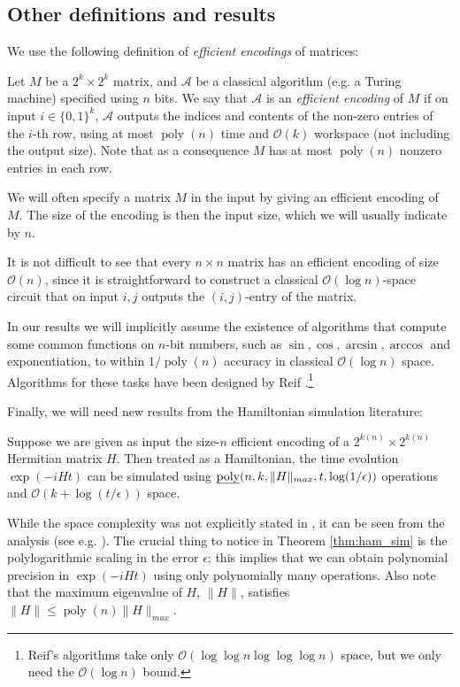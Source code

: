 \documentclass[a4paper,UKenglish]{lipics-v2016}
\newcommand\bigoh{\mathcal{O}}
\DeclareMathOperator{\poly}{poly}
\begin{document}
\subsection{Other definitions and results}
We use the following definition of \emph{efficient encodings} of matrices:
\begin{definition}\label{def: efficient encoding}Let $M$ be a $2^{k} \times 2^{k}$ matrix, and $\mathcal{A}$ be a classical algorithm (e.g. a Turing machine) specified using $n$ bits. We say that $\mathcal{A}$ is an \emph{efficient encoding} of $M$ if on input $i\in\{0,1\}^k$, $\mathcal{A}$ outputs the indices and contents of the non-zero entries of the $i$-th row, using at most $\poly(n)$ time and $\bigoh(k)$ workspace (not including the output size). Note that as a consequence $M$ has at most $\poly(n)$ nonzero entries in each row.
\end{definition}
We will often specify a matrix $M$ in the input by giving an efficient encoding of $M$. The size of the encoding is then the input size, which we will usually indicate by $n$. 
\begin{remark} \label{rem:logspace}
It is not difficult to see that every $n \times n$ matrix has an efficient encoding of size $\bigoh(n)$, since it is straightforward to construct a classical $\bigoh(\log n)$-space circuit that on input $i,j$ outputs the $(i,j)$-entry of the matrix.
\end{remark}

In our results we will implicitly assume the existence of algorithms that compute some common functions on $n$-bit numbers, such as $\sin,\cos,\arcsin,\arccos$ and exponentiation, to within $1/\poly(n)$ accuracy in classical $\bigoh (\log{n})$ space.  Algorithms for these tasks have been designed by Reif \cite{reif}.\footnote{Reif's algorithms take only $\bigoh (\log\log{n}\log\log\log{n})$ space, but we only need the $\bigoh (\log{n})$ bound.}

Finally, we will need new results from the Hamiltonian simulation literature:
\begin{theorem} \label{thm:ham_sim}
Suppose we are given as input the size-$n$ efficient encoding of a $2^{k(n)} \times 2^{k(n)}$ Hermitian matrix $H$. Then treated as a Hamiltonian, the time evolution $\exp(-iHt)$ can be simulated using $\text{\emph{poly}}(n,k,\|H\|_{max}, t, \log(1/\epsilon))$ operations and $\bigoh(k+\log(t/\epsilon))$ space.
\end{theorem}
While the space complexity was not explicitly stated in \cite{berry14,bccks15,berry15}, it can be seen from the analysis (see e.g. \cite{bccks15}). The crucial thing to notice in Theorem \ref{thm:ham_sim} is the polylogarithmic scaling in the error $\epsilon$; this implies that we can obtain polynomial precision in $\exp(-iHt)$ using only polynomially many operations. Also note that the maximum eigenvalue of $H$, $\|H\|$, satisfies $\|H\| \le \poly(n) \|H\|_{max}$.
\end{document}
